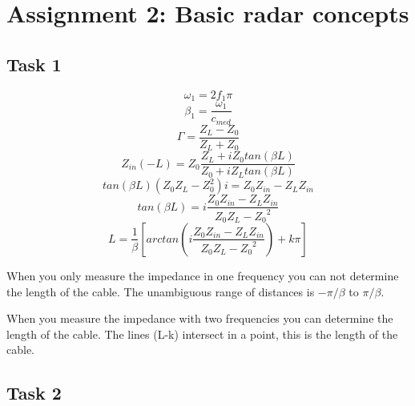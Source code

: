 \documentclass[final]{scrreprt} %
\begin{document}
\chapter{Assignment 2: Basic radar concepts}
\label{ch:sk5-ass2}
\section{Task 1}
\label{sec:sk5-tsk1}
\begin{equation}
\omega_{1}=2f_1\pi
\end{equation}
\begin{equation}
\beta_{1}=\frac{\omega_{1}}{c_{med}}
\end{equation}
\begin{equation}
\Gamma=\frac{Z_L-Z_0}{Z_L+Z_0}
\end{equation}
\begin{equation}
{Z}_{in}(-L)=Z_0\frac{Z_L+iZ_0tan(\beta L)}{Z_0+iZ_Ltan(\beta L)}
\end{equation}
\begin{equation}
tan(\beta L) (Z_0 Z_L-Z_0^2) i=Z_0 Z_{in}-Z_L Z_{in}
\end{equation}
\begin{equation}
tan(\beta L)=i\frac{Z_0 Z_{in} - Z_L Z_{in}}{Z_0Z_L - {Z_0}^2}
\end{equation}
\begin{equation}
L=\frac{1}{\beta}\left[arctan\left(i\frac{Z_0 Z_{in} - Z_L Z_{in}}{Z_0 Z_L - {Z_0}^2}\right)+k\pi\right]
\end{equation}

When you only measure the impedance in one frequency you can not determine the length of the cable.
The unambiguous range of distances is $-\pi/\beta$ to $\pi/\beta$.

When you measure the impedance with two frequencies you can determine the length of the cable.
The lines (L-k) intersect in a point, this is the length of the cable.

\section{Task 2}
\label{sec:sk5-tsk2}
\end{document}
